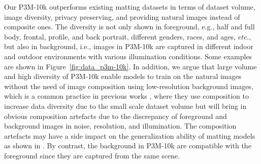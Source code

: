 \documentclass[twocolumn]{svjour3}
\begin{document}
Our P3M-10k outperforms existing matting datasets in terms of dataset volume, image diversity, privacy preserving, and providing natural images instead of composite ones. The diversity is not only shown in foreground, e.g., half and full body, frontal, profile, and back portrait, different genders, races, and ages, $etc$., but also in background, i.e., images in P3M-10k are captured in different indoor and outdoor environments with various illumination conditions. Some examples are shown in Figure~\ref{fig:data_p3m-10k}. In addition, we argue that large volume and high diversity of P3M-10k enable models to train on the natural images without the need of image composition using low-resolution background images, which is a common practice in previous works \citep{dim, hatt}, where they use composition to increase data diversity due to the small scale dataset volume but will bring in obvious composition artefacts due to the discrepancy of foreground and background images in noise, resolution, and illumination. The composition artefacts may have a side impact on the generalization ability of matting models as shown in \citep{gfm}. By contrast, the background in P3M-10k are compatible with the foreground since they are captured from the same scene.

\begin{table*}[htb]
\begin{center}
\end{center}
\caption{Results of trimap-based traditional methods on the blurred images (``B'') and normal images (``N'') in P3M-500-P.}
\label{tab:benchmark_trimap_based_traditional}
\end{table*}
\end{document}
